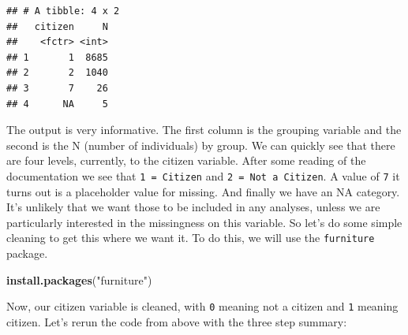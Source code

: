 \documentclass[]{tufte-book}
\newenvironment{Shaded}{}{}
\newcommand{\KeywordTok}[1]{\textcolor[rgb]{0.00,0.44,0.13}{\textbf{#1}}}
\newcommand{\DataTypeTok}[1]{\textcolor[rgb]{0.56,0.13,0.00}{#1}}
\newcommand{\DecValTok}[1]{\textcolor[rgb]{0.25,0.63,0.44}{#1}}
\newcommand{\StringTok}[1]{\textcolor[rgb]{0.25,0.44,0.63}{#1}}
\newcommand{\OperatorTok}[1]{\textcolor[rgb]{0.40,0.40,0.40}{#1}}
\newcommand{\NormalTok}[1]{#1}
\theoremstyle{definition}
\theoremstyle{definition}
\theoremstyle{remark}
\begin{document}
\begin{verbatim}
## # A tibble: 4 x 2
##   citizen     N
##    <fctr> <int>
## 1       1  8685
## 2       2  1040
## 3       7    26
## 4      NA     5
\end{verbatim}

The output is very informative. The first column is the grouping
variable and the second is the N (number of individuals) by group. We
can quickly see that there are four levels, currently, to the citizen
variable. After some reading of the documentation we see that
\texttt{1\ =\ Citizen} and \texttt{2\ =\ Not\ a\ Citizen}. A value of
\texttt{7} it turns out is a placeholder value for missing. And finally
we have an NA category. It's unlikely that we want those to be included
in any analyses, unless we are particularly interested in the
missingness on this variable. So let's do some simple cleaning to get
this where we want it. To do this, we will use the \texttt{furniture}
package.

\begin{Shaded}
\begin{Highlighting}[]
\KeywordTok{install.packages}\NormalTok{(}\StringTok{"furniture"}\NormalTok{)}
\end{Highlighting}
\end{Shaded}

\begin{Shaded}
\end{Shaded}

Now, our citizen variable is cleaned, with \texttt{0} meaning not a
citizen and \texttt{1} meaning citizen. Let's rerun the code from above
with the three step summary:

\begin{Shaded}
\end{Shaded}
\end{document}

